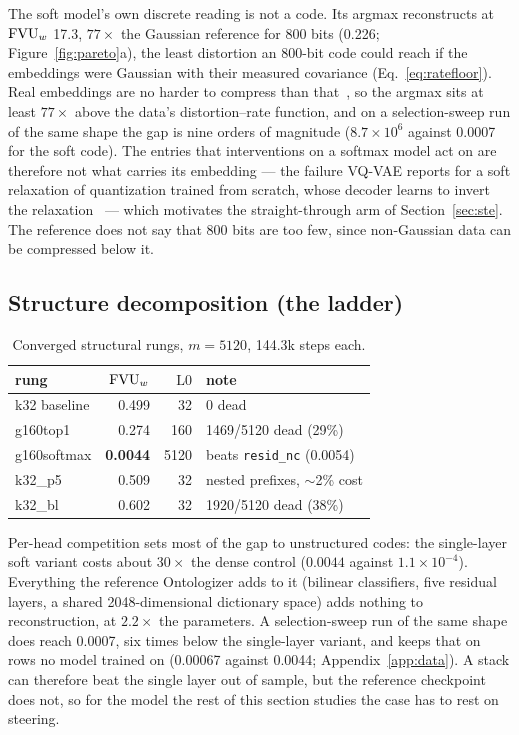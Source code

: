 The soft model's own discrete reading is not a code. Its argmax
reconstructs at $\mathrm{FVU}_w$ 17.3, $77\times$ the Gaussian reference for 800
bits (0.226; Figure~\ref{fig:pareto}a), the least distortion an 800-bit code could reach if the
embeddings were Gaussian with their measured covariance
(Eq.~\eqref{eq:ratefloor}). Real embeddings are no harder to compress
than that~\cite[Problem~10.8]{cover2006}, so the argmax sits at least
$77\times$ above the data's distortion--rate function, and on a
selection-sweep run of the same shape the gap is nine orders of magnitude
($8.7\times10^6$ against 0.0007 for the soft code). The entries that
interventions on a softmax model act on are therefore not what carries
its embedding --- the failure VQ-VAE reports for a soft relaxation of
quantization trained from scratch, whose decoder learns to invert the
relaxation~\cite{vandenoord2017} --- which motivates the straight-through
arm of Section~\ref{sec:ste}. The reference does not say that 800 bits are too
few, since non-Gaussian data can be compressed below it.

\subsection{Structure decomposition (the ladder)}

\begin{table}[htbp]\centering\small
\begin{tabular}{@{}lrrl@{}}
\toprule
rung & $\mathrm{FVU}_w$ & $\mathrm{L0}$ & note \\
\midrule
k32 baseline    & 0.499 & 32   & 0 dead \\
g160top1        & 0.274 & 160  & 1469/5120 dead (29\%) \\
g160softmax     & \textbf{0.0044} & 5120 & beats \texttt{resid\_nc} (0.0054) \\
k32\_p5         & 0.509 & 32   & nested prefixes, $\sim$2\% cost \\
k32\_bl         & 0.602 & 32   & 1920/5120 dead (38\%) \\
\bottomrule
\end{tabular}
\caption{Converged structural rungs, $m{=}5120$, 144.3k steps each.}
\end{table}

Per-head competition sets most of the gap to unstructured codes: the
single-layer soft variant costs about $30\times$ the dense control
($0.0044$ against $1.1\times10^{-4}$). Everything the reference
Ontologizer adds to it (bilinear classifiers, five residual layers, a
shared 2048-dimensional dictionary space) adds nothing to reconstruction,
at $2.2\times$ the parameters. A selection-sweep run of the same shape
does reach 0.0007, six times below the single-layer variant, and keeps
that on rows no model trained on (0.00067 against 0.0044;
Appendix~\ref{app:data}). A stack can therefore beat the single layer out
of sample, but the reference checkpoint does not, so for the model the
rest of this section studies the case has to rest on steering.

